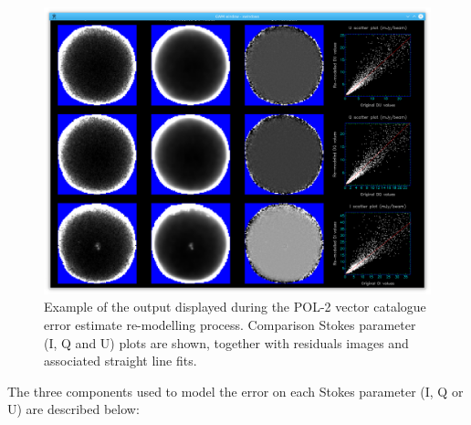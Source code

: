 \begin{figure}[ht!]
\begin{center}
\includegraphics[width=0.9\linewidth]{sc22-ophl1688-pol2noise-fitting-1.png}
\caption [Plotting Window produced During POL-2 Vector Catalogue Error Estimate Remodelling for Oph L1688]{Example of the output displayed during the POL-2
vector catalogue error estimate re-modelling process. Comparison Stokes parameter
(I, Q and U) plots are shown, together with residuals images and associated straight line fits.
}
\label{fig:remodellingwindow}
\end{center}
\end{figure}

The three components used to model the error on each Stokes parameter (I, Q or U) are described below:

